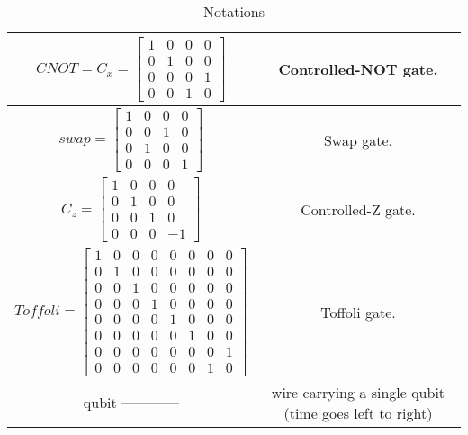 \documentclass[12pt]{report}
\begin{document}
\begin{table}[h!]
\begin{tabular}{|c|c|}
\hline
$CNOT = C_x = \begin{bmatrix} 1&0&0&0\\0&1&0&0\\0&0&0&1 \\0&0&1&0\end{bmatrix}$ & Controlled-NOT gate.\\
\hline
$swap = \begin{bmatrix} 1&0&0&0\\0&0&1&0\\0&1&0&0 \\0&0&0&1\end{bmatrix}$ & Swap gate.\\
\hline
$C_z = \begin{bmatrix} 1&0&0&0\\0&1&0&0\\0&0&1&0 \\0&0&0&-1\end{bmatrix}$ & Controlled-Z gate.\\
\hline
$Toffoli = \begin{bmatrix} 1&0&0&0&0&0&0&0\\0&1&0&0&0&0&0&0\\0&0&1&0&0&0&0&0 \\0&0&0&1&0&0&0&0\\0&0&0&0&1&0&0&0 \\ 0&0&0&0&0&1&0&0 \\ 0&0&0&0&0&0&0&1 \\ 0&0&0&0&0&0&1&0\end{bmatrix}$ & Toffoli gate.\\
\hline
qubit ------------ & wire carrying a single qubit (time goes left to right)\\
\hline
\end{tabular}
\caption{Notations} 
\end{table}
\newpage
\end{document}
